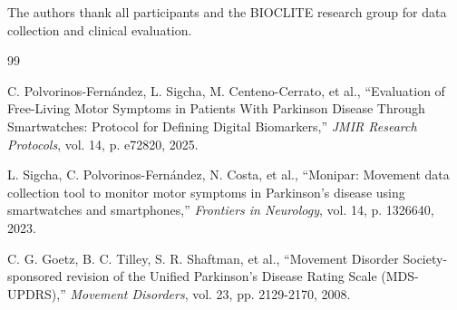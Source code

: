 \documentclass{article}
\begin{document}
The authors thank all participants and the BIOCLITE research group for data collection and clinical evaluation.

\begin{thebibliography}{99}

C. Polvorinos-Fernández, L. Sigcha, M. Centeno-Cerrato, et al.,
``Evaluation of Free-Living Motor Symptoms in Patients With Parkinson Disease Through Smartwatches: Protocol for Defining Digital Biomarkers,''
\textit{JMIR Research Protocols}, vol. 14, p. e72820, 2025.

L. Sigcha, C. Polvorinos-Fernández, N. Costa, et al.,
``Monipar: Movement data collection tool to monitor motor symptoms in Parkinson's disease using smartwatches and smartphones,''
\textit{Frontiers in Neurology}, vol. 14, p. 1326640, 2023.

C. G. Goetz, B. C. Tilley, S. R. Shaftman, et al.,
``Movement Disorder Society-sponsored revision of the Unified Parkinson's Disease Rating Scale (MDS-UPDRS),''
\textit{Movement Disorders}, vol. 23, pp. 2129-2170, 2008.

\end{thebibliography}
\end{document}
